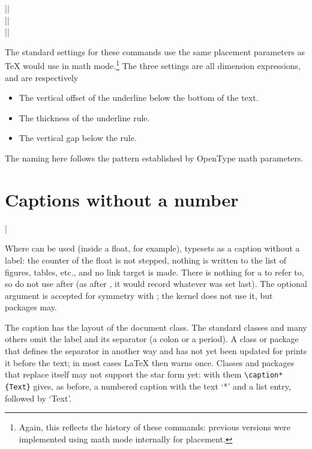 \documentclass{ltxguide}
\begin{document}
\begin{decl}
  |\underline@text@vgap|    \\
  |\underline@text@thickness| \\
  |\underline@text@kern|
\end{decl}
The standard settings for these commands use the same placement parameters as
\TeX{} would use in math mode.\footnote{Again, this reflects the history of
these commands: previous versions were implemented using math mode internally
for placement.} The three settings are all dimension expressions, and are
respectively
\begin{itemize}
  \item The vertical offset of the underline below the bottom of the text.
  \item The thickness of the underline rule.
  \item The vertical gap below the rule.
\end{itemize}
The naming here follows the pattern established by OpenType math parameters.

\section{Captions without a number}

\begin{decl}
  |\caption*|  
\end{decl}
Where  can be used (inside a float, for example), 
typesets  as a caption without a label: the counter of the float
is not stepped, nothing is written to the list of figures, tables, etc., and
no link target is made. There is nothing for a  to refer to, so do
not use  after  (as after , it would
record whatever was set last). The optional argument is accepted for symmetry with
; the kernel does not use it, but packages may.

The caption has the layout of the document class. The standard classes and
many others omit the label and its separator (a colon or a period). A class
or package that defines the separator in another way and has not yet been
updated for  prints it before the text; in most cases \LaTeX{}
then warns once. Classes and packages that replace  itself may
not support the star form yet: with them \verb|\caption*{Text}| gives, as
before, a numbered caption with the text `*' and a list entry, followed by
`Text'.
\end{document}
